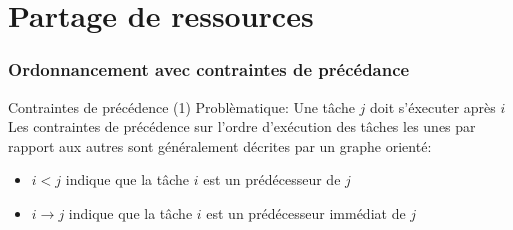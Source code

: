 %
%
%

\part{Partage de ressources}

\begin{frame}
  \partpage
\end{frame}

\begin{frame}
  \tableofcontents[currentpart]
\end{frame}

\section{Ordonnancement avec contraintes de précédance}

\begin{frame}{Contraintes de précédence (1)} 
  Problèmatique: Une tâche $j$ doit s'éxecuter après $i$\\

  Les contraintes de précédence sur l'ordre d'exécution des tâches les
  unes par rapport aux autres sont généralement décrites par un graphe
  orienté:
  \begin{itemize}
  \item $i < j$ indique que  la tâche $i$ est un prédécesseur de
    $j$
  \item $i  → j$  indique que la  tâche $i$ est  un prédécesseur
    immédiat de $j$
  \end{itemize}
  \begin{center}
    
  \end{center}
\end{frame}

